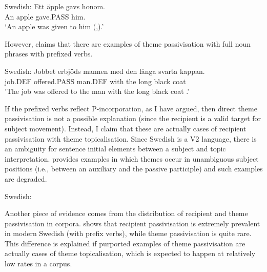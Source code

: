 \begin{exe}
	\ex Swedish:\label{ex:sw-give-pass}
	\gll *Ett äpple gavs honom.\\
	 An apple gave.PASS him.\\
	 \trans `An apple was given to him (\citealt{Anward.1989},\citealt{Lundquist.2006}).'
\end{exe}

However, \cite{Lundquist.2004} claims that there are examples of theme passivisation with full noun phrases with prefixed verbs.

\begin{exe}
	\ex Swedish:\label{ex:sw-offer-thepas}
	\gll Jobbet erbjöds mannen med den långa svarta kappan.\\
	job.DEF offered.PASS man.DEF with the long black coat\\
	'The job was offered to the man with the long black coat \citep[ex 26]{Lundquist.2004}.'
\end{exe}

If the prefixed verbs reflect P-incorporation, as I have argued, then direct theme passivisation is not a possible explanation (since the recipient is a valid target for subject movement). Instead, I claim that these are actually cases of recipient passivisation with theme topicalisation. Since Swedish is a V2 language, there is an ambiguity for sentence initial elements between a subject and topic interpretation. \cite{Lundquist.2004} provides examples in which themes occur in unambiguous subject positions (i.e., between an auxiliary and the passive participle) and such examples are degraded.

\begin{exe}
	\ex Swedish:\label{ex:sw-relpass}
	\begin{xlist}
	\end{xlist}
\end{exe}

Another piece of evidence comes from the distribution of recipient and theme passivisation in corpora. \cite{Lundquist.2004} shows that recipient passivisation is extremely prevalent in modern Swedish (with prefix verbs), while theme passivisation is quite rare. This difference is explained if purported examples of theme passivisation are actually cases of theme topicalisation, which is expected to happen at relatively low rates in a corpus.

